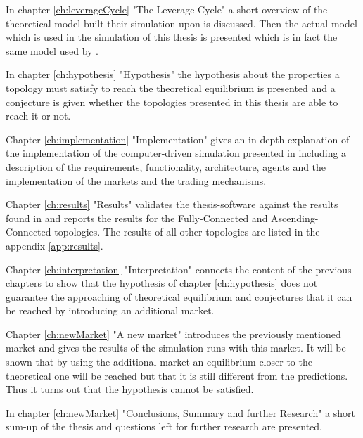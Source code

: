 \documentclass[Bachelorarbeit.tex]{subfiles}
\begin{document}
\bigskip

In chapter \ref{ch:leverageCycle} "The Leverage Cycle" a short overview of the theoretical model \cite{Breuer2015} built their simulation upon is discussed. Then the actual model which is used in the simulation of this thesis is presented which is in fact the same model used by \cite{Breuer2015}.

\bigskip

In chapter \ref{ch:hypothesis} "Hypothesis" the hypothesis about the properties a topology must satisfy to reach the theoretical equilibrium is presented and a conjecture is given whether the topologies presented in this thesis are able to reach it or not.

\bigskip

Chapter \ref{ch:implementation} "Implementation" gives an in-depth explanation of the implementation of the computer-driven simulation presented in \cite{Breuer2015} including a description of the requirements, functionality, architecture, agents and the implementation of the markets and the trading mechanisms.

\bigskip

Chapter \ref{ch:results} "Results" validates the thesis-software against the results found in \cite{Breuer2015} and reports the results for the Fully-Connected and Ascending-Connected topologies. The results of all other topologies are listed in the appendix \ref{app:results}.

\bigskip

Chapter \ref{ch:interpretation} "Interpretation" connects the content of the previous chapters to show that the hypothesis of chapter \ref{ch:hypothesis} does not guarantee the approaching of theoretical equilibrium and conjectures that it can be reached by introducing an additional market.

\bigskip

Chapter \ref{ch:newMarket} "A new market" introduces the previously mentioned market and gives the results of the simulation runs with this market. It will be shown that by using the additional market an equilibrium closer to the theoretical one will be reached but that it is still different from the predictions. Thus it turns out that the hypothesis cannot be satisfied.

\bigskip

In chapter \ref{ch:newMarket} "Conclusions, Summary and further Research" a short sum-up of the thesis and questions left for further research are presented.
\end{document}
